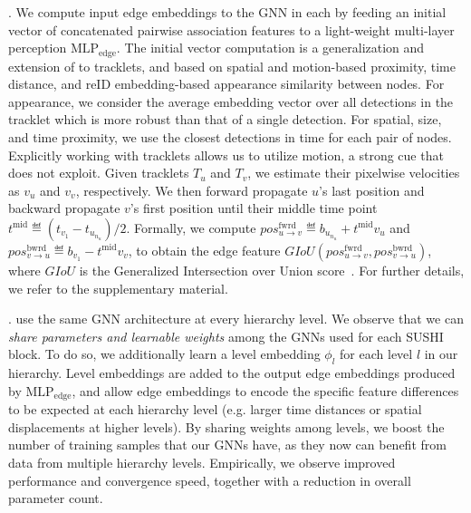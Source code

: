 \documentclass[10pt,twocolumn,letterpaper]{article}
\begin{document}
{{. We compute input edge embeddings to the GNN in each \blockname by feeding an initial vector of concatenated pairwise association features to a light-weight multi-layer perception $\text{MLP}_{\text{edge}}$. The initial vector computation is a generalization and extension of \cite{mpntrack} to tracklets, and based on spatial 
 and motion-based proximity, time distance, and reID embedding-based appearance similarity between nodes. For appearance, we consider the average embedding vector over all detections in the tracklet which is more robust than that of a single detection. For spatial, size, and time proximity, we use the closest detections in time for each pair of nodes. Explicitly working with tracklets allows us to utilize motion, a strong cue that ~\cite{mpntrack} does not exploit. Given tracklets $T_u$ and $T_v$, we estimate their pixelwise velocities as $v_u$ and $v_v$, respectively. We then forward propagate $u$'s last position and backward propagate $v$'s first position until their middle time point $t^{\text{mid}} \eqdef (t_{v_1} - t_{u_{n_u}}) / 2$. Formally, we compute $pos_{u\rightarrow v}^{\text{fwrd}} \eqdef b_{u_{n_u}} + t^{\text{mid}}v_u$ and $pos_{v\rightarrow u}^{\text{bwrd}} \eqdef b_{v_1} - t^{\text{mid}}v_v$, to obtain the edge feature $GIoU(pos_{u\rightarrow v}^{\text{fwrd}}, pos_{v\rightarrow u}^{\text{bwrd}})$, where $GIoU$ is the Generalized Intersection over Union score~\cite{rezatofighi2019generalized}. For further details, we refer to the supplementary material.

. \blocknameplural use the same GNN architecture at every hierarchy level. We observe that we can \textit{share parameters and learnable weights} among the GNNs used for each SUSHI block. To do so, we additionally learn a level embedding $\phi_l$ for each level $l$ in our hierarchy. Level embeddings are added to the output edge embeddings produced by $\text{MLP}_{\text{edge}}$, and allow edge embeddings to encode the specific feature differences to be expected at each hierarchy level (e.g. larger time distances or  spatial displacements at higher levels). By sharing weights among levels, we boost the number of training samples that our GNNs have, as they now can benefit from data from multiple hierarchy levels. Empirically, we observe improved performance and convergence speed, together with a reduction in overall parameter count. 


}}
\end{document}
